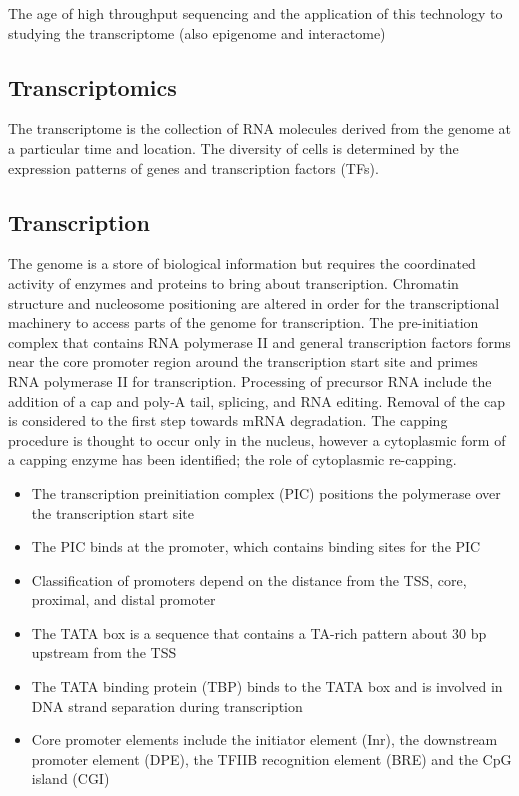 The age of high throughput sequencing and the application of this technology to studying the transcriptome (also epigenome and interactome)

\subsection{Transcriptomics}

The transcriptome is the collection of RNA molecules derived from the genome at a particular time and location. The diversity of cells is determined by the expression patterns of genes and transcription factors (TFs).

\subsection{Transcription}

The genome is a store of biological information but requires the coordinated activity of enzymes and proteins to bring about transcription. Chromatin structure and nucleosome positioning are altered in order for the transcriptional machinery to access parts of the genome for transcription. The pre-initiation complex that contains RNA polymerase II and general transcription factors forms near the core promoter region around the transcription start site and primes RNA polymerase II for transcription. Processing of precursor RNA include the addition of a cap and poly-A tail, splicing, and RNA editing. Removal of the cap is considered to the first step towards mRNA degradation. The capping procedure is thought to occur only in the nucleus, however a cytoplasmic form of a capping enzyme has been identified; the role of cytoplasmic re-capping.

\begin{itemize}

   \item The transcription preinitiation complex (PIC) positions the polymerase over the transcription start site
   \item The PIC binds at the promoter, which contains binding sites for the PIC
   \item Classification of promoters depend on the distance from the TSS, core, proximal, and distal promoter
   \item The TATA box is a sequence that contains a TA-rich pattern about 30 bp upstream from the TSS
   \item The TATA binding protein (TBP) binds to the TATA box and is involved in DNA strand separation during transcription
   \item Core promoter elements include the initiator element (Inr), the downstream promoter element (DPE), the TFIIB recognition element (BRE) and the CpG island (CGI)

\end{itemize}

